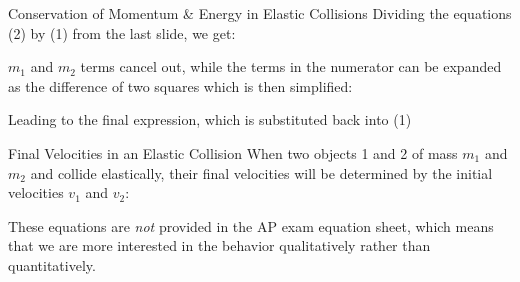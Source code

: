 \documentclass[12pt,compress,aspectratio=169]{beamer}
\begin{document}
\begin{frame}{Conservation of Momentum \& Energy in Elastic Collisions}
  Dividing the equations (2) by (1) from the last slide, we get:


  $m_1$ and $m_2$ terms cancel out, while the terms in the numerator can be
  expanded as the difference of two squares which is then simplified:

  
  Leading to the final expression, which is substituted back into (1)
  

\end{frame}



%  
%




\begin{frame}{Final Velocities in an Elastic Collision}
  When two objects 1 and 2 of mass $m_1$ and $m_2$ and  collide elastically,
  their final velocities will be determined by the initial velocities $v_1$ and
  $v_2$:
  

  These equations are \emph{not} provided in the AP exam equation sheet, which
  means that we are more interested in the behavior qualitatively rather than
  quantitatively.
\end{frame}
\end{document}
